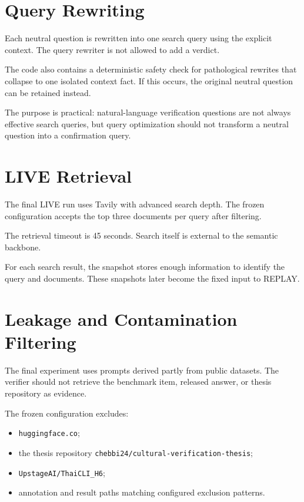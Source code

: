 \section{Query Rewriting}

Each neutral question is rewritten into one search query using the explicit context. The query rewriter is not allowed to add a verdict.

The code also contains a deterministic safety check for pathological rewrites that collapse to one isolated context fact. If this occurs, the original neutral question can be retained instead.

The purpose is practical: natural-language verification questions are not always effective search queries, but query optimization should not transform a neutral question into a confirmation query.

\section{LIVE Retrieval}

The final LIVE run uses Tavily with advanced search depth. The frozen configuration accepts the top three documents per query after filtering.

The retrieval timeout is 45 seconds. Search itself is external to the semantic backbone.

For each search result, the snapshot stores enough information to identify the query and documents. These snapshots later become the fixed input to REPLAY.

\section{Leakage and Contamination Filtering}

The final experiment uses prompts derived partly from public datasets. The verifier should not retrieve the benchmark item, released answer, or thesis repository as evidence.

The frozen configuration excludes:

\begin{itemize}
\item \texttt{huggingface.co};
\item the thesis repository \texttt{chebbi24/cultural-verification-thesis};
\item \texttt{UpstageAI/ThaiCLI\_H6};
\item annotation and result paths matching configured exclusion patterns.
\end{itemize}

